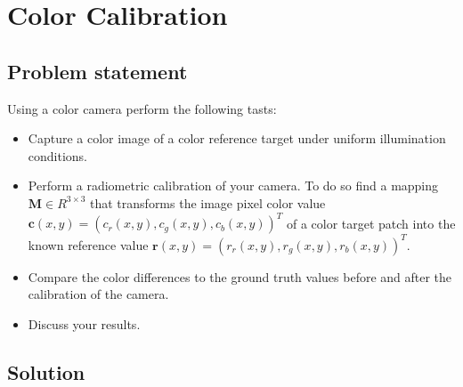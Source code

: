\documentclass[
a4paper,     %
11pt         %
]{scrartcl}  %
\begin{document}
\section{Color Calibration}

\subsection{Problem statement}

Using a color camera perform the following tasts:

\begin{itemize}
 \item Capture a color image of a color reference target under uniform illumination conditions.
 \item Perform a radiometric calibration of your camera. To do so find a mapping $\bm{M} \in R^{3 \times 3}$ that transforms the image pixel color value $\bm{c}(x,y) = (c_r(x,y), c_g(x,y), c_b(x,y))^T$ of a color target patch into the known reference value $\bm{r}(x,y) = (r_r(x,y), r_g(x,y), r_b(x,y))^T$.
 \item Compare the color differences to the ground truth values before and after the calibration of the camera.
 \item Discuss your results.
\end{itemize}

\subsection{Solution}
\end{document}
